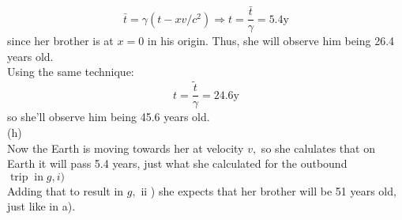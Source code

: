 \documentclass[UTF8]{ctexart}
\begin{document}
	$$\bar{t}=\gamma\left(t-x v / c^{2}\right) \Longrightarrow t=\frac{\bar{t}}{\gamma}=5.4 \mathrm{y}$$
	since her brother is at $x=0$ in his origin. Thus, she will observe him being 26.4 years old.\\
	Using the same technique:\\
	$$t=\frac{\tilde{t}}{\gamma}=24.6 \mathrm{y}$$
	so she'll observe him being 45.6 years old.\\
	(h)\\
	Now the Earth is moving towards her at velocity $v,$ so she calulates that on Earth it will pass 5.4 years, just what she calculated for the outbound $\operatorname{trip} \operatorname{in} g, i)$\\
	Adding that to result in $g,$ ii ) she expects that her brother will be 51 years old, just like in a).\\
	
\end{document}
